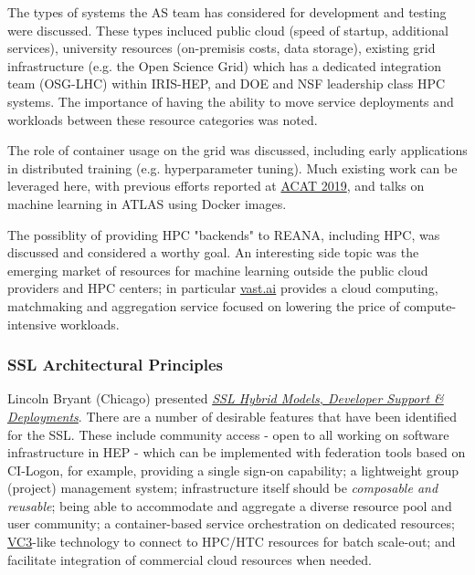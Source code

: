 \documentclass[11pt,letterpaper,fleqn]{article}
\begin{document}
The types of systems the AS team has considered for development and testing were discussed. These types incluced public cloud (speed of startup, additional services), university resources (on-premisis costs, data storage), existing grid infrastructure (e.g. the Open Science Grid) which has a dedicated integration team (OSG-LHC) within IRIS-HEP, and DOE and NSF leadership class HPC systems. The importance of having the ability to move service deployments and workloads between these resource categories was noted.

The role of container usage on the grid was discussed, including early applications in distributed training (e.g. hyperparameter tuning).  Much existing work can be leveraged here, with previous efforts reported at \href{https://indico.cern.ch/event/708041/}{ACAT 2019}, and talks on machine learning in ATLAS using Docker images.

The possiblity of providing HPC "backends" to {\sf REANA}, including HPC, was discussed and considered a worthy goal. An interesting side topic was the emerging market of resources for machine learning outside the public cloud providers and HPC centers; in particular \href{Vast.ai}{vast.ai} provides a cloud computing, matchmaking and aggregation service focused on lowering the price of compute-intensive workloads.

\subsubsection{SSL Architectural Principles}
\vspace{0.2cm}
Lincoln Bryant (Chicago) presented \href{https://indico.cern.ch/event/820946/contributions/3461592/attachments/1866998/3119402/2019.06.21_SSL_Patterns__Deployments_Lincoln.pdf}{\textit{SSL Hybrid Models, Developer Support \& Deployments}}. There are a number of desirable features that have been identified for the SSL.  These include community access - open to all working on software infrastructure in HEP - which can be implemented with federation tools based on {\sf CI-Logon}, for example, providing a single sign-on capability; a lightweight group (project) management system; infrastructure itself should be \textit{composable and reusable}; being able to accommodate and aggregate a diverse resource pool and user community; a container-based service orchestration on dedicated resources; \href{http://www.virtualclusters.org/}{VC3}-like technology to connect to HPC/HTC resources for batch scale-out; and facilitate integration of commercial cloud resources when needed.
\end{document}

